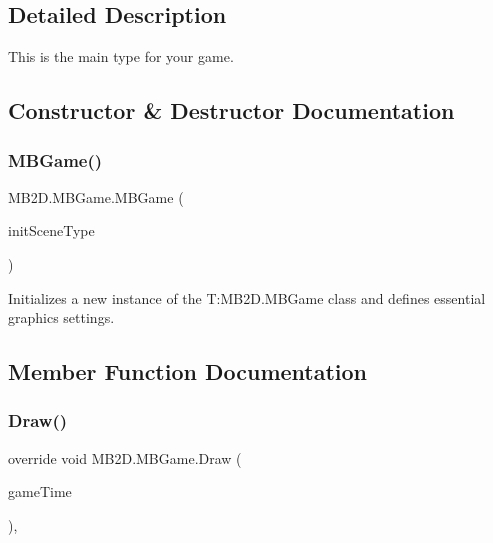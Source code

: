 \subsection{Detailed Description}
This is the main type for your game. 



\subsection{Constructor \& Destructor Documentation}
\hypertarget{class_m_b2_d_1_1_m_b_game_aa75fd490a977436f16a048d38face6f9}{}\label{class_m_b2_d_1_1_m_b_game_aa75fd490a977436f16a048d38face6f9} 
\subsubsection{\texorpdfstring{M\+B\+Game()}{MBGame()}}
{\footnotesize\ttfamily M\+B2\+D.\+M\+B\+Game.\+M\+B\+Game (\begin{DoxyParamCaption}\item[{Type}]{init\+Scene\+Type }\end{DoxyParamCaption})\hspace{0.3cm}{\ttfamily [inline]}}



Initializes a new instance of the T\+:\+M\+B2\+D.\+M\+B\+Game class and defines essential graphics settings. 



\subsection{Member Function Documentation}
\hypertarget{class_m_b2_d_1_1_m_b_game_ad791072c4d2a5b23bbaec3542d6facc9}{}\label{class_m_b2_d_1_1_m_b_game_ad791072c4d2a5b23bbaec3542d6facc9} 
\subsubsection{\texorpdfstring{Draw()}{Draw()}}
{\footnotesize\ttfamily override void M\+B2\+D.\+M\+B\+Game.\+Draw (\begin{DoxyParamCaption}\item[{Game\+Time}]{game\+Time }\end{DoxyParamCaption})\hspace{0.3cm}{\ttfamily [inline]}, {\ttfamily [protected]}}



